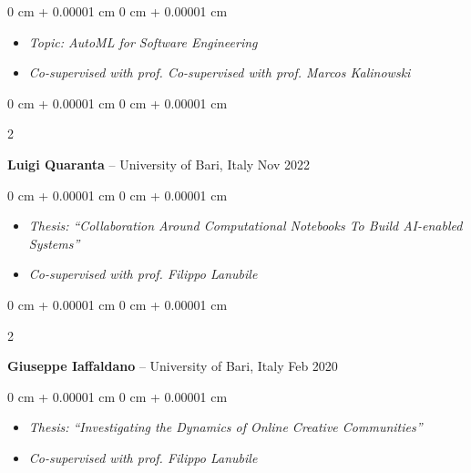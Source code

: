 \documentclass[10pt, a4paper]{article}
\newenvironment{highlights}{
    \begin{itemize}[
        topsep=0.10 cm,
        parsep=0.10 cm,
        partopsep=0pt,
        itemsep=0pt,
        leftmargin=0 cm + 10pt
    ]
}{
    \end{itemize}
} %
\newenvironment{onecolentry}{
    \begin{adjustwidth}{
        0 cm + 0.00001 cm
    }{
        0 cm + 0.00001 cm
    }
}{
    \end{adjustwidth}
} %
\newenvironment{twocolentry}[2][]{
    \onecolentry
    \def\secondColumn{#2}
    \setcolumnwidth{\fill, 4.5 cm}
    \begin{paracol}{2}
}{
    \switchcolumn \raggedleft \secondColumn
    \end{paracol}
    \endonecolentry
} %
\begin{document}
        \vspace{0.10 cm}
        \begin{onecolentry}
            \begin{highlights}
                \item \textit{Topic: AutoML for Software Engineering}
                \item \textit{Co-supervised with prof. Co-supervised with prof. Marcos Kalinowski}
            \end{highlights}
        \end{onecolentry}


        \vspace{0.2 cm}

        \begin{twocolentry}{
            Nov 2022
        }
            \textbf{Luigi Quaranta} -- University of Bari, Italy\end{twocolentry}

        \vspace{0.10 cm}
        \begin{onecolentry}
            \begin{highlights}
                \item \textit{Thesis: ``Collaboration Around Computational Notebooks To Build AI-enabled Systems''}
                \item \textit{Co-supervised with prof. Filippo Lanubile}
            \end{highlights}
        \end{onecolentry}


        \vspace{0.2 cm}

        \begin{twocolentry}{
            Feb 2020
        }
            \textbf{Giuseppe Iaffaldano} -- University of Bari, Italy\end{twocolentry}

        \vspace{0.10 cm}
        \begin{onecolentry}
            \begin{highlights}
                \item \textit{Thesis: ``Investigating the Dynamics of Online Creative Communities''}
                \item \textit{Co-supervised with prof. Filippo Lanubile}
            \end{highlights}
        \end{onecolentry}
\end{document}
